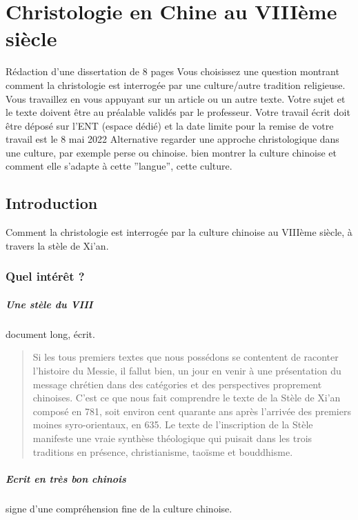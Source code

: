 \chapter{Christologie en Chine au VIIIème siècle}

Rédaction d’une dissertation de 8 pages Vous choisissez une question
montrant comment la christologie est interrogée par une culture/autre tradition
religieuse. Vous travaillez en vous appuyant sur un article ou un autre texte.
Votre sujet et le texte doivent être au préalable validés par le professeur. Votre
travail écrit doit être déposé sur l’ENT (espace dédié) et la date limite pour la
remise de votre travail est le 8 mai 2022
Alternative regarder une approche christologique dans une culture, par exemple
perse ou chinoise. bien montrer la culture chinoise et comment elle s’adapte à
cette ”langue”, cette culture.


\section{Introduction}

Comment la christologie est interrogée par la culture chinoise au VIIIème siècle, à travers la stèle de Xi'an.

\subsection{Quel intérêt ?}
\paragraph{Une stèle du VIII} document long, écrit. 
\begin{quote}
Si les tous premiers textes que nous possédons se contentent de raconter l'histoire du Messie, il fallut bien, un jour en venir à une présentation du message chrétien dans des catégories et des perspectives proprement chinoises. C'est ce que nous fait comprendre le texte de la Stèle de Xi'an composé en 781, soit environ cent quarante ans après l'arrivée des premiers moines syro-orientaux, en 635. 
Le texte de l'inscription de la Stèle manifeste une vraie synthèse théologique qui puisait dans les trois traditions en présence, christianisme, taoïsme et bouddhisme. \cite[p.~150]{Raguin:JesusMessieXian} 
\end{quote}

\paragraph{Ecrit en très bon chinois} signe d'une compréhension fine de la culture chinoise.


